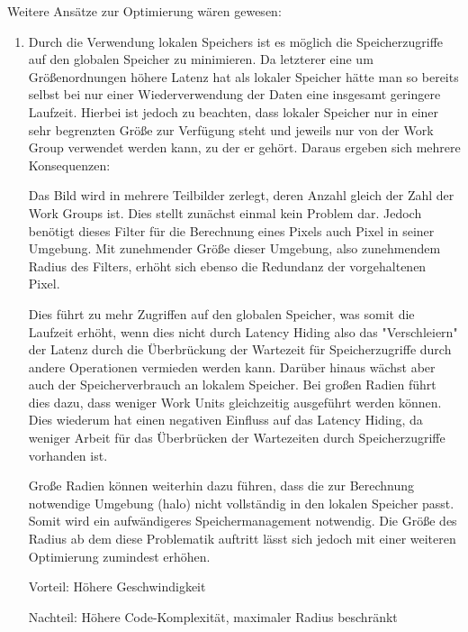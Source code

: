 \documentclass[10pt,a4paper]{article}
\begin{document}
Weitere Ansätze zur Optimierung wären gewesen:
\begin{enumerate}
\item Durch die Verwendung lokalen Speichers ist es möglich die Speicherzugriffe auf den globalen Speicher zu minimieren. Da letzterer eine um Größenordnungen höhere Latenz hat als lokaler Speicher hätte man so bereits selbst bei nur einer Wiederverwendung der Daten eine insgesamt geringere Laufzeit. Hierbei ist jedoch zu beachten, dass lokaler Speicher nur in einer sehr begrenzten Größe zur Verfügung steht und jeweils nur von der Work Group verwendet werden kann, zu der er gehört. Daraus ergeben sich mehrere Konsequenzen:

Das Bild wird in mehrere Teilbilder zerlegt, deren Anzahl gleich der Zahl der Work Groups ist. Dies stellt zunächst einmal kein Problem dar. Jedoch benötigt dieses Filter für die Berechnung eines Pixels auch Pixel in seiner Umgebung. Mit zunehmender Größe dieser Umgebung, also zunehmendem Radius des Filters, erhöht sich ebenso die Redundanz der vorgehaltenen Pixel.




Dies führt zu mehr Zugriffen auf den globalen Speicher, was somit die Laufzeit erhöht, wenn dies nicht durch Latency Hiding also das "Verschleiern" der Latenz durch die Überbrückung der Wartezeit für Speicherzugriffe durch andere Operationen vermieden werden kann.
Darüber hinaus wächst aber auch der Speicherverbrauch an lokalem Speicher. Bei großen Radien führt dies dazu, dass weniger Work Units gleichzeitig ausgeführt werden können. Dies wiederum hat einen negativen Einfluss auf das Latency Hiding, da weniger Arbeit für das Überbrücken der Wartezeiten durch Speicherzugriffe vorhanden ist. 



Große Radien können weiterhin dazu führen, dass die zur Berechnung notwendige Umgebung (halo) nicht vollständig in den lokalen Speicher passt. Somit wird ein aufwändigeres Speichermanagement notwendig. Die Größe des Radius ab dem diese Problematik auftritt lässt sich jedoch mit einer weiteren Optimierung zumindest erhöhen.

	Vorteil: Höhere Geschwindigkeit

	Nachteil: Höhere Code-Komplexität, maximaler Radius beschränkt



\end{enumerate}
\end{document}

